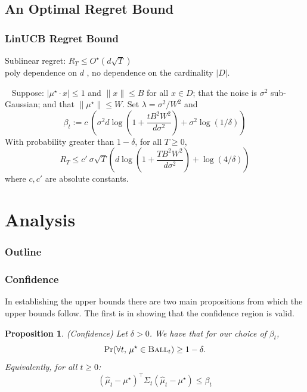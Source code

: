 \documentclass[aspectratio=169]{beamer}
\newtheorem{proposition}[theorem]{Proposition}
\begin{document}
\subsection{An Optimal Regret Bound}

\begin{frame}\frametitle{LinUCB Regret Bound}

Sublinear regret: $R_T \leq O^\star(d \sqrt{T})$ \\
\alert{poly dependence on $d$} , no dependence on the cardinality $|D|$.

\pause
\begin{theorem}~\label{theorem:sqrtregret}
Suppose: $|\mu^\star\cdot x| \leq 1$ and $\|x\|\leq B$ for all $x\in
D$; that the noise is $\sigma^2$ sub-Gaussian; and that
$\|\mu^\star\|\leq W$. Set
$\lambda =\sigma^2/W^2$ and
\[
\beta_t := c \ \left( \sigma^2 d \log\left( 1 + \frac{tB^2W^2}{d\sigma^2} \right) + \sigma^2 \log(1/\delta) \right)
\]
With probability greater than $1-\delta$, for all $T\geq 0$, 
\[
R_T \leq c' \ \sigma \sqrt{T} \left( d\log\left( 1 + \frac{TB^2W^2}{ d\sigma^2} \right)
+   \log(4/ \delta) \right)
\]
where $c,c'$ are absolute constants. 
\end{theorem}


\end{frame}



\section{Analysis}

 \begin{frame}[noframenumbering]
    \frametitle{Outline}
    \tableofcontents[currentsection]
  \end{frame}


\begin{frame}\frametitle{Confidence}

In establishing the upper bounds there are two main propositions from
which the upper bounds follow. The first is in showing that the
confidence region is valid. 

\begin{proposition} \label{proposition:confidence} 
(Confidence) Let $\delta>0$.  We have that for our choice of $\beta_t$,
\[
\Pr(\forall t, \, \mu^\star \in \textsc{Ball}_t ) \ge 1 - \delta.
\]
Equivalently, for all $t \ge 0$:
\[
(\widehat{\mu}_t - \mu^\star)^\top \Sigma_t (\widehat{\mu}_t - \mu^\star) \le \beta_t
\]
\end{proposition}



\end{frame}
\end{document}
